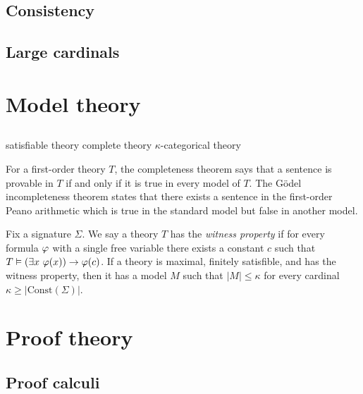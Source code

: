 \documentclass{../../large}
\begin{document}
\chapter{Consistency}

\chapter{Large cardinals}





\part{Model theory}

\chapter{}

satisfiable theory
complete theory
$\kappa$-categorical theory

For a first-order theory $T$, the completeness theorem says that a sentence is provable in $T$ if and only if it is true in every model of $T$.
The G\"odel incompleteness theorem states that there exists a sentence in the first-order Peano arithmetic which is true in the standard model but false in another model.



\begin{prb}
Fix a signature $\Sigma$.
We say a theory $T$ has the \emph{witness property} if for every formula $\varphi$ with a single free variable there exists a constant $c$ such that $T\vDash(\exists x\ \f(x))\to\f(c)$.
If a theory is maximal, finitely satisfible, and has the witness property, then it has a model $M$ such that $|M|\le\kappa$ for every cardinal $\kappa\ge|\mathrm{Const}(\Sigma)|$.
\end{prb}

\begin{prb}
\end{prb}

\begin{prb}
\end{prb}


\part{Proof theory}
\chapter{Proof calculi}
\end{document}
